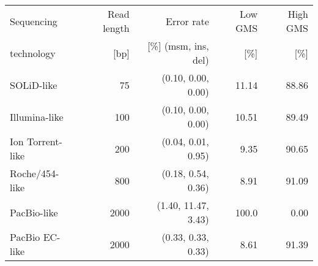 \begin{table}[h]
    \begin{tabular}{lrrrr}
    \toprule
    Sequencing                 & Read length   & Error rate & Low GMS          & High GMS \\
    technology                 & [bp]          & [\%] (msm, ins, del) & [\%]             & [\%] \\
    \midrule
    SOLiD-like                 & 75            & (0.10, 0.00, 0.00) & 11.14            & 88.86      \\
    Illumina-like              & 100           & (0.10, 0.00, 0.00) & 10.51            & 89.49      \\
    Ion Torrent-like           & 200           & (0.04, 0.01, 0.95) & 9.35  & 90.65      \\
    Roche/454-like             & 800           & (0.18, 0.54, 0.36) & 8.91  & 91.09      \\
	PacBio-like                & 2000          & (1.40, 11.47, 3.43) & 100.0            & 0.00      \\
	PacBio EC-like             & 2000          & (0.33, 0.33, 0.33) & 8.61  & 91.39      \\
    \bottomrule
    \end{tabular}
\end{table}